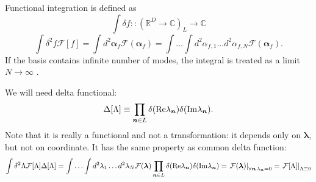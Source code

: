 Functional integration is defined as
\[
	\int \delta f ::
	(\mathbb{R}^D \rightarrow \mathbb{C})_L	\rightarrow \mathbb{C}
\]
\[
	\int \delta^2 f \mathcal{F}[f]
	= \int d^2\bm{\alpha}_f \mathcal{F}(\bm{\alpha}_f)
	= \int \ldots \int d^2\alpha_{f,1} \ldots d^2\alpha_{f,N} \mathcal{F}(\bm{\alpha}_f).
\]
If the basis contains infinite number of modes, the integral is treated as a limit $N \rightarrow \infty$ .

We will need delta functional:
\[
	\Delta[\Lambda]
	\equiv \prod_{\boldsymbol{n} \in L} \delta(\mathrm{Re} \lambda_{\boldsymbol{n}}) \delta(\mathrm{Im} \lambda_{\boldsymbol{n}}).
\]
Note that it is really a functional and not a transformation:
it depends only on $\bm{\lambda}$, but not on coordinate.
It has the same property as common delta function:
\[
	\int \delta^2 \Lambda \mathcal{F}[\Lambda] \Delta[\Lambda]
	= \int \ldots \int d^2\lambda_1 \ldots d^2\lambda_N \mathcal{F}(\bm{\lambda})
		\prod_{\boldsymbol{n} \in L} \delta(\mathrm{Re} \lambda_{\boldsymbol{n}}) \delta(\mathrm{Im} \lambda_{\boldsymbol{n}})
	= \left. \mathcal{F}(\bm{\lambda}) \right|_{\forall \boldsymbol{n}\, \lambda_{\boldsymbol{n}} = 0}
	= \left. \mathcal{F}[\Lambda] \right|_{\Lambda \equiv 0}
\]

